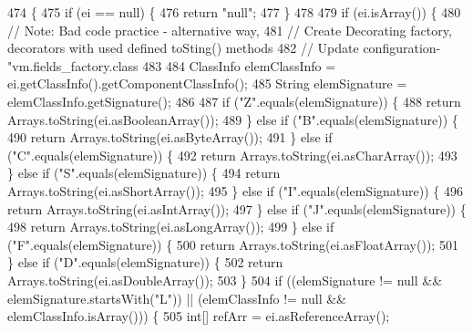 \begin{DoxyCode}
474                                                            \{
475     \textcolor{keywordflow}{if} (ei == null) \{
476       \textcolor{keywordflow}{return} \textcolor{stringliteral}{"null"};
477     \}
478 
479     \textcolor{keywordflow}{if} (ei.isArray()) \{
480       \textcolor{comment}{// Note: Bad code practice - alternative way,}
481       \textcolor{comment}{// Create Decorating factory, decorators with used defined toSting() methods}
482       \textcolor{comment}{// Update configuration- "vm.fields\_factory.class}
483 
484       ClassInfo elemClassInfo = ei.getClassInfo().getComponentClassInfo();
485       String elemSignature = elemClassInfo.getSignature();
486 
487       \textcolor{keywordflow}{if} (\textcolor{stringliteral}{"Z"}.equals(elemSignature)) \{
488         \textcolor{keywordflow}{return} Arrays.toString(ei.asBooleanArray());
489       \} \textcolor{keywordflow}{else} \textcolor{keywordflow}{if} (\textcolor{stringliteral}{"B"}.equals(elemSignature)) \{
490         \textcolor{keywordflow}{return} Arrays.toString(ei.asByteArray());
491       \} \textcolor{keywordflow}{else} \textcolor{keywordflow}{if} (\textcolor{stringliteral}{"C"}.equals(elemSignature)) \{
492         \textcolor{keywordflow}{return} Arrays.toString(ei.asCharArray());
493       \} \textcolor{keywordflow}{else} \textcolor{keywordflow}{if} (\textcolor{stringliteral}{"S"}.equals(elemSignature)) \{
494         \textcolor{keywordflow}{return} Arrays.toString(ei.asShortArray());
495       \} \textcolor{keywordflow}{else} \textcolor{keywordflow}{if} (\textcolor{stringliteral}{"I"}.equals(elemSignature)) \{
496         \textcolor{keywordflow}{return} Arrays.toString(ei.asIntArray());
497       \} \textcolor{keywordflow}{else} \textcolor{keywordflow}{if} (\textcolor{stringliteral}{"J"}.equals(elemSignature)) \{
498         \textcolor{keywordflow}{return} Arrays.toString(ei.asLongArray());
499       \} \textcolor{keywordflow}{else} \textcolor{keywordflow}{if} (\textcolor{stringliteral}{"F"}.equals(elemSignature)) \{
500         \textcolor{keywordflow}{return} Arrays.toString(ei.asFloatArray());
501       \} \textcolor{keywordflow}{else} \textcolor{keywordflow}{if} (\textcolor{stringliteral}{"D"}.equals(elemSignature)) \{
502         \textcolor{keywordflow}{return} Arrays.toString(ei.asDoubleArray());
503       \}
504       \textcolor{keywordflow}{if} ((elemSignature != null && elemSignature.startsWith(\textcolor{stringliteral}{"L"})) || (elemClassInfo != null && 
      elemClassInfo.isArray())) \{
505         \textcolor{keywordtype}{int}[] refArr = ei.asReferenceArray();

\end{DoxyCode}

